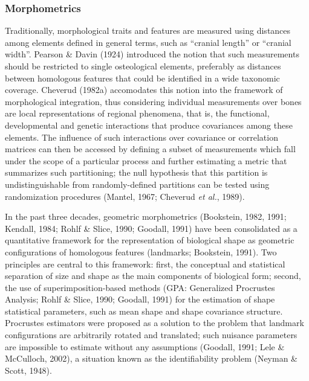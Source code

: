 \documentclass[12pt,twoside]{report}
\begin{document}
\subsubsection{Morphometrics}\label{morphometrics}

Traditionally, morphological traits and features are measured using
distances among elements defined in general terms, such as ``cranial
length'' or ``cranial width''. Pearson \& Davin (1924) introduced the
notion that such measurements should be restricted to single
osteological elements, preferably as distances between homologous
features that could be identified in a wide taxonomic coverage. Cheverud
(1982a) accomodates this notion into the framework of morphological
integration, thus considering individual measurements over bones are
local representations of regional phenomena, that is, the functional,
developmental and genetic interactions that produce covariances among
these elements. The influence of such interactions over covariance or
correlation matrices can then be accessed by defining a subset of
measurements which fall under the scope of a particular process and
further estimating a metric that summarizes such partitioning; the null
hypothesis that this partition is undistinguishable from
randomly-defined partitions can be tested using randomization procedures
(Mantel, 1967; Cheverud \emph{et al.}, 1989).

In the past three decades, geometric morphometrics (Bookstein, 1982,
1991; Kendall, 1984; Rohlf \& Slice, 1990; Goodall, 1991) have been
consolidated as a quantitative framework for the representation of
biological shape as geometric configurations of homologous features
(landmarks; Bookstein, 1991). Two principles are central to this
framework: first, the conceptual and statistical separation of size and
shape as the main components of biological form; second, the use of
superimposition-based methods (GPA: Generalized Procrustes Analysis;
Rohlf \& Slice, 1990; Goodall, 1991) for the estimation of shape
statistical parameters, such as mean shape and shape covariance
structure. Procrustes estimators were proposed as a solution to the
problem that landmark configurations are arbitrarily rotated and
translated; such nuisance parameters are impossible to estimate without
any assumptions (Goodall, 1991; Lele \& McCulloch, 2002), a situation
known as the identifiability problem (Neyman \& Scott, 1948).
\end{document}
